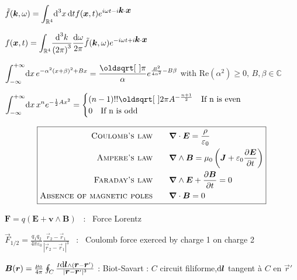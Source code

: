 $\tilde{f}(\mbox{\boldmath$k$},\omega) = \displaystyle{\int_{\mathbb{R}^4}} \textrm{d} ^3x\, \textrm{d} t f(\mbox{\boldmath$x$},t) e^{i\omega t - i \mbox{\boldmath$k$}\cdot\mbox{\boldmath$x$}}$  

$f(\mbox{\boldmath$x$}, t) = \displaystyle{\int_{\mathbb{R}^4}} \dfrac{\textrm{d} ^3k}{\left(2\pi\right)^3} \dfrac{\textrm{d} \omega}{2\pi} \tilde{f}(\mbox{\boldmath$k$},\omega)e^{-i\omega t + i \mbox{\boldmath$k$}\cdot\mbox{\boldmath$x$}}$


\squishlist
\item $\displaystyle{\int_{-\infty}^{+\infty}} \ud x \, e^{-\alpha^2(x+\beta)^2 + Bx} = \dfrac{\sqrt{\pi}}{\alpha} \displaystyle{e^{\frac{B^2}{4\alpha^2}-B\beta}} $ with Re$(\alpha^2) \ge 0, \, B, \beta \in \mathbb{C}$ 

\item $      \displaystyle{\int_{-\infty}^{+\infty}} \ud x \, x^n e^{-\frac{1}{2}Ax^2} = 
\begin{cases}
(n-1)!!\sqrt{2\pi}A^{-\frac{n+1}{2}} \quad \text{If n is even} \\
0 \quad \text{If n is odd}
\end{cases}
$
\squishend
{}

$$\boxed{\begin{split}
\textsc{Coulomb's law} \qquad &\boldsymbol{\nabla} \cdot \boldsymbol{E} = \frac{\rho}{\varepsilon_0}\\
\textsc{Ampere's law} \qquad &\boldsymbol{\nabla} \wedge \boldsymbol{B} = \mu_0 \left(\boldsymbol{J} + \varepsilon_0\frac{\partial \boldsymbol{E}}{\partial t}\right)\\
\textsc{Faraday's law} \qquad &\boldsymbol{\nabla} \wedge \boldsymbol{E} + \frac{\partial \boldsymbol{B}}{\partial t} = 0\\
\textsc{Absence of magnetic poles} \qquad &\boldsymbol{\nabla} \cdot \boldsymbol{B} = 0
\end{split}}$$
\vspace{1cm}

\squishlist
\item $ \boldsymbol{F} = q(\boldsymbol{E}+\boldsymbol{v} \wedge \boldsymbol{B}) $ \, :  \, Force Lorentz

\item $ \vec{F}_{1/2} = \frac{q_1q_2}{4\pi\varepsilon_0} \frac{\vec{r}_2 - \vec{r}_1}{|\vec{r}_2 - \vec{r}_1|^3} $ \, : \, Coulomb force exerced by charge 1 on charge 2
\item $\mbox{\boldmath$B$}(\mbox{\boldmath$r$}) = \frac{\mu_0}{4\pi} \oint_{C} \frac{I \mbox{\boldmath$\textrm{d} l$} \wedge (\mbox{\boldmath$r$} - \mbox{\boldmath$r$}')}{|\mbox{\boldmath$r$}-\mbox{\boldmath$r$}'|^3} $  :  Biot-Savart : $C$ circuit filiforme,$\mbox{\boldmath$\textrm{d} l$}$ tangent à $C$ en  $\vec{r}'$

